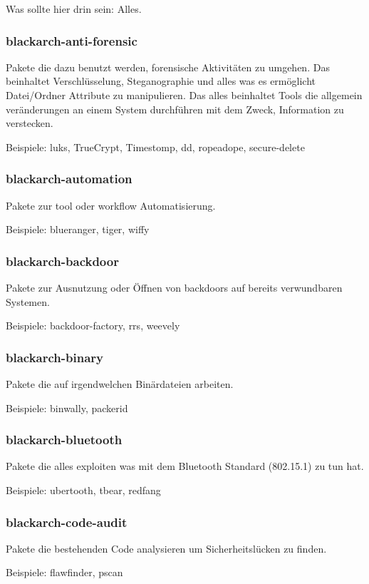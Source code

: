 \documentclass[a4paper, oneside, 11pt]{book}
\begin{document}
Was sollte hier drin sein: Alles.

\subsubsection{blackarch-anti-forensic}
Pakete die dazu benutzt werden, forensische Aktivitäten zu umgehen. Das beinhaltet Verschlüsselung, Steganographie 
und alles was es ermöglicht Datei/Ordner Attribute zu manipulieren.
Das alles beinhaltet Tools die allgemein veränderungen an einem System durchführen mit dem Zweck,
Information zu verstecken. 

Beispiele: luks, TrueCrypt, Timestomp, dd, ropeadope, secure-delete

\subsubsection{blackarch-automation}
Pakete zur tool oder workflow Automatisierung.

Beispiele: blueranger, tiger, wiffy

\subsubsection{blackarch-backdoor}
Pakete zur Ausnutzung oder Öffnen von backdoors auf bereits verwundbaren
Systemen.

Beispiele: backdoor-factory, rrs, weevely

\subsubsection{blackarch-binary}
Pakete die auf irgendwelchen Binärdateien arbeiten.

Beispiele: binwally, packerid

\subsubsection{blackarch-bluetooth}
Pakete die alles exploiten was mit dem Bluetooth Standard (802.15.1) zu tun hat.

Beispiele: ubertooth, tbear, redfang

\subsubsection{blackarch-code-audit}
Pakete die bestehenden Code analysieren um Sicherheitslücken zu finden.

Beispiele: flawfinder, pscan
\end{document}
